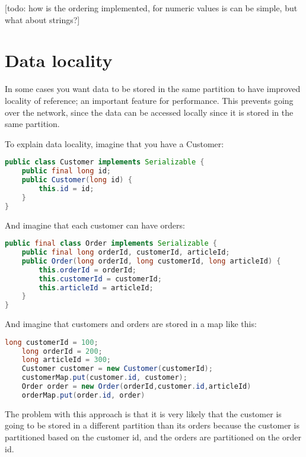 [todo: how is the ordering implemented, for numeric values is can be simple, but what about strings?]

\section{Data locality}
In some cases you want data to be stored in the same partition to have improved locality of reference; an important feature for performance. This prevents going over the network, since the data can be accessed locally since it is stored in the same partition.

To explain data locality, imagine that you have a Customer:
\begin{lstlisting}[language=java]
public class Customer implements Serializable {
    public final long id;
    public Customer(long id) {
        this.id = id;
    }
}
\end{lstlisting}
And imagine that each customer can have orders:
\begin{lstlisting}[language=java]
public final class Order implements Serializable {
    public final long orderId, customerId, articleId;
    public Order(long orderId, long customerId, long articleId) {
        this.orderId = orderId;
        this.customerId = customerId;
        this.articleId = articleId;
    }
}
\end{lstlisting}
And imagine that customers and orders are stored in a map like this:
\begin{lstlisting}[language=java]
    long customerId = 100;
    long orderId = 200;
    long articleId = 300;
    Customer customer = new Customer(customerId);
    customerMap.put(customer.id, customer);
    Order order = new Order(orderId,customer.id,articleId)
	orderMap.put(order.id, order)
\end{lstlisting}
The problem with this approach is that it is very likely that the customer is going to be stored in a different partition than its orders because the customer is partitioned based on the customer id, and the orders are partitioned on the order id.


